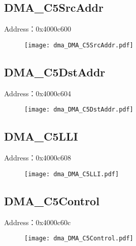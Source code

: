\subsection{DMA\_C5SrcAddr}
\label{dma-DMA-C5SrcAddr}
Address：0x4000c600
 \begin{figure}[H]
\texttt{[image: dma\_DMA\_C5SrcAddr.pdf]}
\end{figure}

\subsection{DMA\_C5DstAddr}
\label{dma-DMA-C5DstAddr}
Address：0x4000c604
 \begin{figure}[H]
\texttt{[image: dma\_DMA\_C5DstAddr.pdf]}
\end{figure}

\subsection{DMA\_C5LLI}
\label{dma-DMA-C5LLI}
Address：0x4000c608
 \begin{figure}[H]
\texttt{[image: dma\_DMA\_C5LLI.pdf]}
\end{figure}

\subsection{DMA\_C5Control}
\label{dma-DMA-C5Control}
Address：0x4000c60c
 \begin{figure}[H]
\texttt{[image: dma\_DMA\_C5Control.pdf]}
\end{figure}

